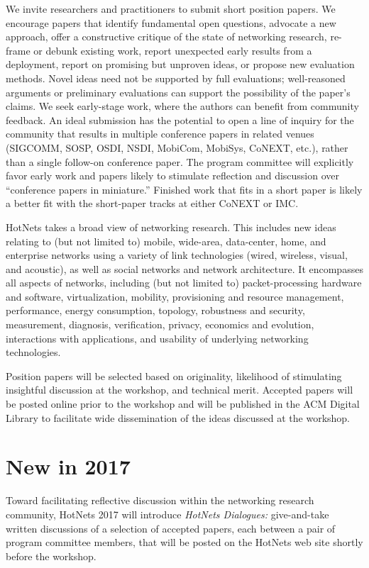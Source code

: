 \documentclass{hotnets17}
\begin{document}
We invite researchers and practitioners to submit short position
papers. We encourage papers that identify fundamental open questions,
advocate a new approach, offer a constructive critique of the state of
networking research, re-frame or debunk existing work, report
unexpected early results from a deployment, report on promising but
unproven ideas, or propose new evaluation methods. Novel ideas need
not be supported by full evaluations; well-reasoned arguments or
preliminary evaluations can support the possibility of the paper's
claims. We seek early-stage work, where the authors can benefit from
community feedback. An ideal submission has the potential to open a
line of inquiry for the community that results in multiple conference
papers in related venues (SIGCOMM, SOSP, OSDI, NSDI, MobiCom, MobiSys,
CoNEXT, etc.), rather than a single follow-on conference paper. The
program committee will explicitly favor early work and papers likely
to stimulate reflection and discussion over ``conference papers in
miniature.'' Finished work that fits in a short paper is likely a
better fit with the short-paper tracks at either CoNEXT or IMC.

HotNets takes a broad view of networking research. This includes new
ideas relating to (but not limited to) mobile, wide-area, data-center,
home, and enterprise networks using a variety of link technologies
(wired, wireless, visual, and acoustic), as well as social networks
and network architecture. It encompasses all aspects of networks,
including (but not limited to) packet-processing hardware and
software, virtualization, mobility, provisioning and resource
management, performance, energy consumption, topology, robustness and
security, measurement, diagnosis, verification, privacy, economics and
evolution, interactions with applications, and usability of underlying
networking technologies.

Position papers will be selected based on originality, likelihood of
stimulating insightful discussion at the workshop, and technical
merit. Accepted papers will be posted online prior to the workshop and
will be published in the ACM Digital Library to facilitate wide
dissemination of the ideas discussed at the workshop.

\section{New in 2017}

Toward facilitating reflective discussion within the networking
research community, HotNets 2017 will introduce {\it HotNets Dialogues:}
give-and-take written discussions of a selection of accepted papers,
each between a pair of program committee members, that will be posted
on the HotNets web site shortly before the workshop.
\end{document}
